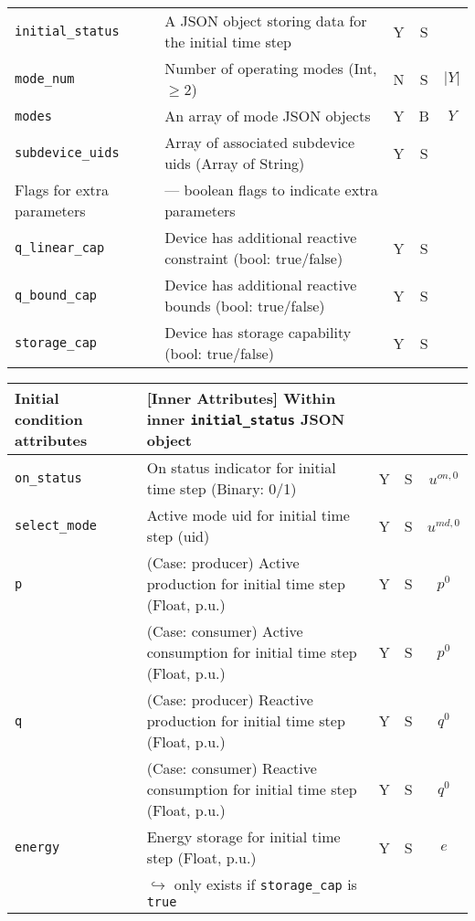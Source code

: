 \documentclass{article}
\begin{document}
\begin{center}
\begin{tabular}{ l | l | c | c | c |}
  {\tt initial\_status} & A JSON object storing data for the initial time step & Y & S &  \\
  {\tt mode\_num} & Number of operating modes (Int, $\geq 2$) & N & S & $\lvert Y \rvert$ \\
  {\tt modes} & An array of mode JSON objects  & Y & B & $Y$ \\
  {\tt subdevice\_uids} & Array of associated subdevice uids (Array of String) & Y & S & \\
  \hline
  Flags for extra parameters &  --- boolean flags to indicate extra parameters  &  &  & \\
  \hline
  {\tt q\_linear\_cap}      & Device has additional reactive constraint (bool: true/false) & Y & S & \\
  {\tt q\_bound\_cap}       & Device has additional reactive bounds (bool: true/false) & Y & S & \\
  {\tt storage\_cap}       & Device has storage capability (bool: true/false) & Y & S & \\
  \hline
  \end{tabular}
\end{center}  

\begin{center}
\small
\begin{tabular}{ l | l | c | c | c |}
  \hline
  Initial condition attributes & [Inner Attributes] Within inner {\tt initial\_status} JSON object &  &  & \\
  \hline    
  {\tt on\_status} & On status indicator for initial time step (Binary: 0/1) & Y & S & $u^{on,0}$\\
  {\tt select\_mode}  & Active mode uid for initial time step (uid) & Y & S & $u^{md,0}$\\
  {\tt p} & {\color{red} (Case: producer) Active production for initial time step (Float, p.u.) }& Y & S & $p^0$ \\
          & {\color{red} (Case: consumer) Active consumption for initial time step (Float, p.u.) }& Y & S & $p^0$ \\
  {\tt q} & {\color{red} (Case: producer) Reactive production for initial time step (Float, p.u.) }& Y & S & $q^0$ \\
          & {\color{red} (Case: consumer) Reactive consumption for initial time step (Float, p.u.) }& Y & S & $q^0$ \\
  {\tt energy} & Energy storage for initial time step (Float, p.u.)& Y & S & $e$\\  
                          & $\hookrightarrow$ only exists if \texttt{storage\_cap} is \texttt{true} & & & \\  
  \hline
  \end{tabular}
\end{center}
\end{document}
